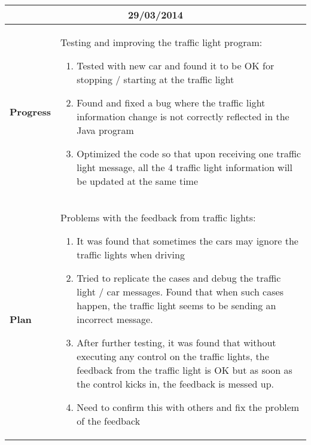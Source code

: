 \begin{center}
\begin{longtable}{ | p{2cm} | p{10cm} | }
                \multicolumn{2}{|c|}{\textbf{29/03/2014}} \\ \hline
                \textbf{Progress} & Testing and improving the traffic light program:
                \begin{enumerate}
                  \item Tested with new car and found it to be OK for stopping / starting at the traffic light
                  \item Found and fixed a bug where the traffic light information change is not correctly reflected in the Java program
                  \item Optimized the code so that upon receiving one traffic light message, all the 4 traffic light information will be updated at the same time
                \end{enumerate}  \\ \hline
                \textbf{Plan} & Problems with the feedback from traffic lights:
                \begin{enumerate}
                  \item It was found that sometimes the cars may ignore the traffic lights when driving
                  \item Tried to replicate the cases and debug the traffic light / car messages. Found that when such cases happen, the traffic light seems to be sending an incorrect message.
                  \item After further testing, it was found that without executing any control on the traffic lights, the feedback from the traffic light is OK but as soon as the control kicks in, the feedback is messed up.
                  \item Need to confirm this with others and fix the problem of the feedback
                \end{enumerate}  \\ \hline


\end{longtable}
\end{center}
